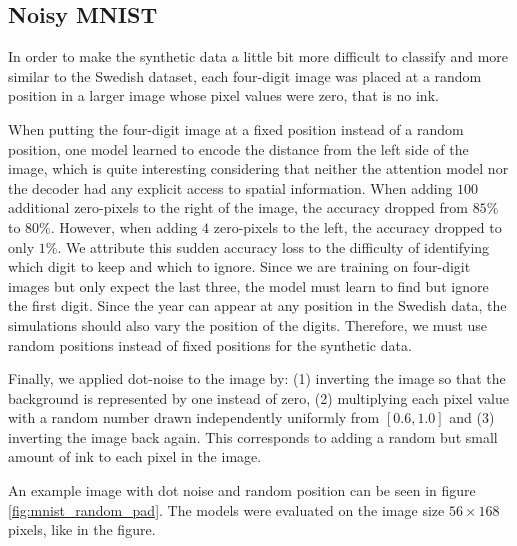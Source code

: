 \subsection{Noisy MNIST}

In order to make the synthetic data a little bit more difficult to classify and more similar to the Swedish dataset, each four-digit image was placed at a random position in a larger image whose pixel values were zero, that is no ink.

When putting the four-digit image at a fixed position instead of a random position, one model learned to encode the distance from the left side of the image, which is quite interesting considering that neither the attention model nor the decoder had any explicit access to spatial information.
When adding $100$ additional zero-pixels to the right of the image, the accuracy dropped from $85\%$ to $80\%$. However, when adding $4$ zero-pixels to the left, the accuracy dropped to only $1\%$. We attribute this sudden accuracy loss to the difficulty of identifying which digit to keep and which to ignore. Since we are training on four-digit images but only expect the last three, the model must learn to find but ignore the first digit.
Since the year can appear at any position in the Swedish data, the simulations should also vary the position of the digits. Therefore, we must use random positions instead of fixed positions for the synthetic data.

Finally, we applied dot-noise to the image by:
(1) inverting the image so that the background is represented by one instead of zero,
(2) multiplying each pixel value with a random number drawn independently uniformly from $[0.6, 1.0]$ and
(3) inverting the image back again.
This corresponds to adding a random but small amount of ink to each pixel in the image.

An example image with dot noise and random position can be seen in figure \ref{fig:mnist_random_pad}. The models were evaluated on the image size $56 \times 168$ pixels, like in the figure.




